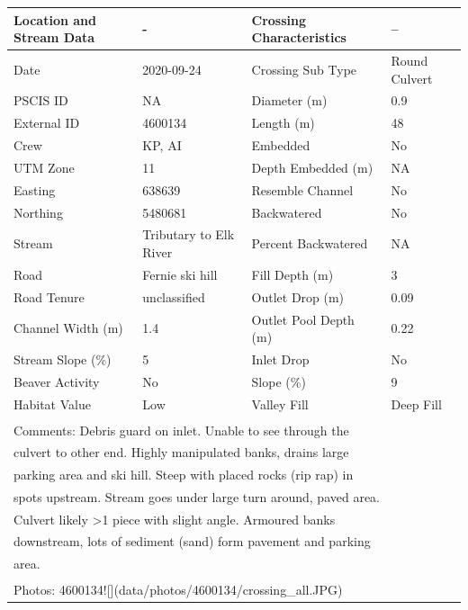\documentclass[
]{book}
\begin{document}
\begin{tabular}{llll}
\toprule
Location and Stream Data & - & Crossing Characteristics & --\\
\midrule
Date & 2020-09-24 & Crossing Sub Type & Round Culvert\\
PSCIS ID & NA & Diameter (m) & 0.9\\
External ID & 4600134 & Length (m) & 48\\
Crew & KP, AI & Embedded & No\\
UTM Zone & 11 & Depth Embedded (m) & NA\\
\addlinespace
Easting & 638639 & Resemble Channel & No\\
Northing & 5480681 & Backwatered & No\\
Stream & Tributary to Elk River & Percent Backwatered & NA\\
Road & Fernie ski hill & Fill Depth (m) & 3\\
Road Tenure & unclassified & Outlet Drop (m) & 0.09\\
\addlinespace
Channel Width (m) & 1.4 & Outlet Pool Depth (m) & 0.22\\
Stream Slope (\%) & 5 & Inlet Drop & No\\
Beaver Activity & No & Slope (\%) & 9\\
Habitat Value & Low & Valley Fill & Deep Fill\\
\bottomrule
\multicolumn{4}{l}{\textsuperscript{} Comments: Debris guard on inlet. Unable to see through the}\\
\multicolumn{4}{l}{culvert to other end. Highly manipulated banks, drains large}\\
\multicolumn{4}{l}{parking area and ski hill. Steep with placed rocks (rip rap) in}\\
\multicolumn{4}{l}{spots upstream. Stream goes under large turn around, paved area.}\\
\multicolumn{4}{l}{Culvert likely >1 piece with slight angle. Armoured banks}\\
\multicolumn{4}{l}{downstream, lots of sediment (sand) form pavement and parking}\\
\multicolumn{4}{l}{area.}\\
\multicolumn{4}{l}{\textsuperscript{} Photos: 4600134![](data/photos/4600134/crossing\_all.JPG)}\\
\end{tabular}
\end{document}
